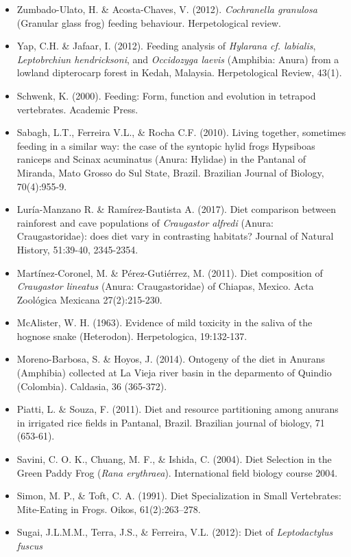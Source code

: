 \begin{itemize}
\item Zumbado-Ulato, H. \& Acosta-Chaves, V. (2012). \textit{Cochranella granulosa} (Granular glass frog) feeding behaviour. Herpetological review.
\item Yap, C.H. \& Jafaar, I. (2012). Feeding analysis of \textit{Hylarana cf. labialis}, \textit{Leptobrchiun hendricksoni}, and \textit{Occidozyga laevis} (Amphibia: Anura) from a lowland dipterocarp forest in Kedah, Malaysia. Herpetological Review, 43(1).
\item Schwenk, K. (2000). Feeding: Form, function and evolution in tetrapod vertebrates. Academic Press.
\item Sabagh, L.T., Ferreira V.L., \& Rocha C.F. (2010). Living together, sometimes feeding in a similar way: the case of the syntopic hylid frogs Hypsiboas raniceps and Scinax acuminatus (Anura: Hylidae) in the Pantanal of Miranda, Mato Grosso do Sul State, Brazil. Brazilian Journal of Biology, 70(4):955-9.
\item Luría-Manzano R. \& Ramírez-Bautista A. (2017). Diet comparison between rainforest and cave populations of \textit{Craugastor alfredi} (Anura: Craugastoridae): does diet vary in contrasting habitats? Journal of Natural History, 51:39-40, 2345-2354.
\item Martínez-Coronel, M. \& Pérez-Gutiérrez, M. (2011). Diet composition of \textit{Craugastor lineatus} (Anura: Craugastoridae) of Chiapas, Mexico. Acta Zoológica Mexicana 27(2):215-230. 
\item McAlister, W. H. (1963). Evidence of mild toxicity in the saliva of the hognose snake (Heterodon). Herpetologica, 19:132-137.
\item Moreno-Barbosa, S. \& Hoyos, J. (2014). Ontogeny of the diet in Anurans (Amphibia) collected at La Vieja river basin in the deparmento of Quindio (Colombia). Caldasia, 36 (365-372).
\item Piatti, L. \& Souza, F. (2011). Diet and resource partitioning among anurans in irrigated rice fields in Pantanal, Brazil. Brazilian journal of biology, 71 (653-61).
\item Savini, C. O. K., Chuang, M. F., \& Ishida, C. (2004). Diet Selection in the Green Paddy Frog (\textit{Rana erythraea}). International field biology course 2004.
\item Simon, M. P., \& Toft, C. A. (1991). Diet Specialization in Small Vertebrates: Mite-Eating in Frogs. Oikos, 61(2):263–278. 
\item Sugai, J.L.M.M., Terra, J.S., \& Ferreira, V.L. (2012): Diet of \textit{Leptodactylus fuscus}

\end{itemize}
